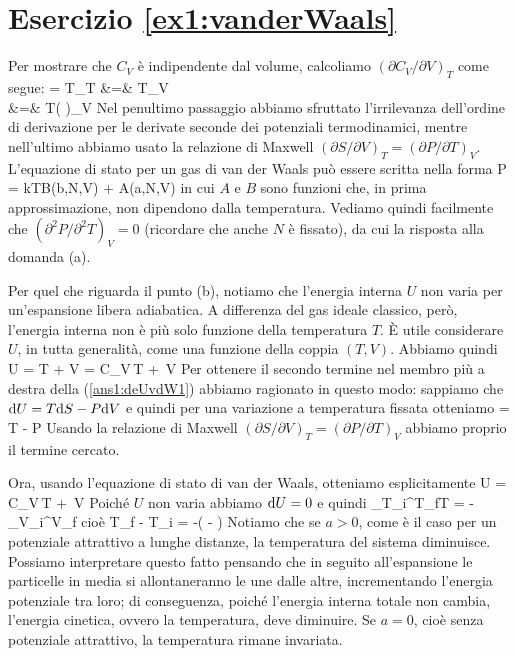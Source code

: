 %
%
\section*{Esercizio \ref{ex1:vanderWaals}}

Per mostrare che $C_V$ è indipendente dal volume, calcoliamo $(\partial C_V/\partial V)_T$ come segue:
\bea
{} = T_T &=& T_V \nonumber \\
&=& T\left(
\right)_V
\eea
Nel penultimo passaggio abbiamo sfruttato l'irrilevanza dell'ordine di derivazione per le derivate seconde dei potenziali termodinamici, mentre nell'ultimo abbiamo usato la relazione di Maxwell 
$(\partial S/\partial V)_T = (\partial P/\partial T)_V$. L'equazione di stato per un gas di van der Waals può essere scritta nella forma
\be
P = kTB(b,N,V) + A(a,N,V)
\ee
in cui $A$ e $B$ sono funzioni che, in prima approssimazione, non dipendono dalla temperatura. Vediamo quindi facilmente che $(\partial^2 P/\partial^2 T)_V = 0$ (ricordare che anche $N$ è fissato), da cui la risposta alla domanda (a).

Per quel che riguarda il punto (b), notiamo che l'energia interna $U$ non varia per un'espansione libera adiabatica. A differenza del gas ideale classico, però, l'energia interna non è più solo funzione della temperatura $T$. È utile considerare $U$, in tutta generalità, come una funzione della coppia $(T,V)$. Abbiamo quindi
\be
\label{ans1:deUvdW1}
\de U = \de T + \de V =
C_V\,\de T + \,\de V
\ee
Per ottenere il secondo termine nel membro più a destra della (\ref{ans1:deUvdW1}) abbiamo ragionato in questo modo: sappiamo che ${\textrm d}U = T{\textrm d}S - P{\textrm d}V$ e quindi per una variazione a temperatura fissata otteniamo
\be
{} = T - P
\ee
Usando la relazione di Maxwell $(\partial S/\partial V)_T = (\partial P/\partial T)_V$ abbiamo proprio il termine cercato.

Ora, usando l'equazione di stato di van der Waals, otteniamo esplicitamente
\be
\de U = C_V\,\de T + \,\de V
\ee
Poiché $U$ non varia abbiamo ${\textrm d}U = 0$ e quindi
\be
\int_{T_i}^{T_f}\de T = -\int_{V_i}^{V_f}
\ee
cioè
\be
T_f - T_i = -\left(
 - 
\right)
\ee
Notiamo che se $a > 0$, come è il caso per un potenziale attrattivo a lunghe distanze, la temperatura del sistema diminuisce. Possiamo interpretare questo fatto pensando che in seguito all'espansione le particelle in media si allontaneranno le une dalle altre, incrementando l'energia potenziale tra loro; di conseguenza, poiché l'energia interna totale non cambia, l'energia cinetica, ovvero la temperatura, deve diminuire. Se $a = 0$, cioè senza potenziale attrattivo, la temperatura rimane invariata.

